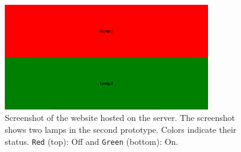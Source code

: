 \begin{figure}[!htb]
    \centering
    \includegraphics[width=0.8\textwidth]{images/Prototype2_Server.png}
    \caption{Screenshot of the website hosted on the server. The screenshot shows two lamps in the second prototype. Colors indicate their status. \texttt{Red} (top): Off and \texttt{Green} (bottom): On.}
    \label{fig:prototype2-server-screenshot}
\end{figure}

